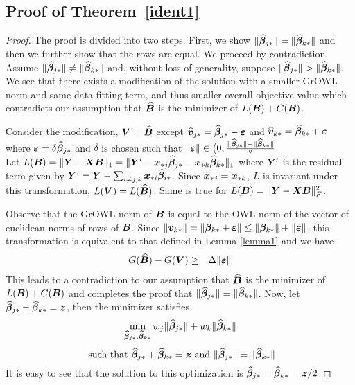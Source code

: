 \subsection*{Proof of Theorem~\ref{ident1}}
\begin{proof}
The proof is divided into two steps. First, we show $\|\widehat {\boldsymbol{\beta}}_{j {\ast}}\| = \|\widehat {\boldsymbol{\beta}}_{k {\ast}}\|$ and then we further show that the rows are equal. 
We proceed by contradiction. Assume $\|\widehat {\boldsymbol{\beta}}_{j {\ast}}\| \neq \|\widehat {\boldsymbol{\beta}}_{k {\ast}}\|$ and, without loss of generality, suppose $\|\widehat {\boldsymbol{\beta}}_{j {\ast}}\| > \|\widehat {\boldsymbol{\beta}}_{k {\ast}}\|$. We see that there exists a modification of the solution with a smaller GrOWL norm and same data-fitting term, and thus smaller overall objective value which contradicts our assumption that $\widehat {\boldsymbol{B}}$ is the minimizer of $L(\boldsymbol{B}) + G(\boldsymbol{B})$. 

Consider the modification, $\boldsymbol{V} = \widehat {\boldsymbol{B}}$ except $\widehat {\boldsymbol{v}}_{j {\ast}} = \widehat {\boldsymbol{\beta}}_{j {\ast}} - \boldsymbol{\varepsilon}$ and $\widehat {\boldsymbol{v}}_{k {\ast}} = \widehat {\boldsymbol{\beta}}_{k {\ast}} + \boldsymbol{\varepsilon}$  where $\boldsymbol{\varepsilon} = \delta \widehat {\boldsymbol{\beta}}_{j {\ast}}$ and $\delta$ is chosen such that $ \| \boldsymbol{\varepsilon} \| \in \big (0, \frac{\|\widehat {\boldsymbol{\beta}}_{j {\ast}}\| - \| \widehat {\boldsymbol{\beta}}_{k {\ast}} \|}{2} \big ]$\\
Let $L(\boldsymbol{B}) = \|\boldsymbol{Y} - \boldsymbol{X} \boldsymbol{B} \|_1 = \|\boldsymbol{Y}' - \boldsymbol{x}_{{\ast} j} \widehat {\boldsymbol{\beta}}_{j {\ast}} - \boldsymbol{x}_{{\ast} k} \widehat {\boldsymbol{\beta}}_{k {\ast}}\|_1$ where $\boldsymbol{Y}'$ is the residual term given by $\boldsymbol{Y}' = \boldsymbol{Y} - \sum_{i \neq j, k} \boldsymbol{x}_{{\ast} i} \widehat {\boldsymbol{\beta}}_{i {\ast}}$. Since $\boldsymbol{x}_{{\ast} j} = \boldsymbol{x}_{{\ast} k}$, $L$ is invariant under this transformation, \ie $L(\boldsymbol{V}) = L(\widehat {\boldsymbol{B}}) $. Same is true for $L(\boldsymbol{B}) = \|\boldsymbol{Y} - \boldsymbol{X} \boldsymbol{B} \|_F^2$.

Observe that the GrOWL norm of $\boldsymbol{B}$ is equal to the OWL norm of the vector of euclidean norms of rows of $\boldsymbol{B}$. Since $\| \boldsymbol{v}_{k {\ast}} \| = \| \boldsymbol{\beta}_{k {\ast}} + \boldsymbol{\varepsilon} \| \leq \| \boldsymbol{\beta}_{k {\ast}} \| + \| \boldsymbol{\varepsilon} \|$, this transformation is equivalent to that defined in Lemma \ref{lemma1} and we have
\begin{eqnarray*}
 G(\widehat{\boldsymbol{B}}) - G(\boldsymbol{V}) & \geq & \Delta \|\boldsymbol{\varepsilon}\| 
\end{eqnarray*}
This leads to a contradiction to our assumption that $\widehat {\boldsymbol{B}}$ is the minimizer of $L(\boldsymbol{B}) + G(\boldsymbol{B})$ and completes the proof that $\|\widehat {\boldsymbol{\beta}}_{j {\ast}}\| = \|\widehat {\boldsymbol{\beta}}_{k {\ast}}\|$.  
Now, let $\widehat {\boldsymbol{\beta}}_{j {\ast}} + \widehat {\boldsymbol{\beta}}_{k {\ast}} = \boldsymbol{z}$, then the minimizer satisfies
$$\min_{\widehat {\boldsymbol{\beta}}_{j {\ast}}, \widehat {\boldsymbol{\beta}}_{k {\ast}}} w_j\|\widehat {\boldsymbol{\beta}}_{j {\ast}}\| + w_k \|\widehat {\boldsymbol{\beta}}_{k {\ast}}\| $$
$$\textnormal{ such that } \widehat {\boldsymbol{\beta}}_{j {\ast}} + \widehat {\boldsymbol{\beta}}_{k {\ast}} = \boldsymbol{z} \textnormal{ and } \|\widehat {\boldsymbol{\beta}}_{j {\ast}}\| = \|\widehat {\boldsymbol{\beta}}_{k {\ast}}\| $$
It is easy to see that the solution to this optimization is $\widehat {\boldsymbol{\beta}}_{j {\ast}} = \widehat {\boldsymbol{\beta}}_{k {\ast}} = \boldsymbol{z}/2$
\end{proof}

